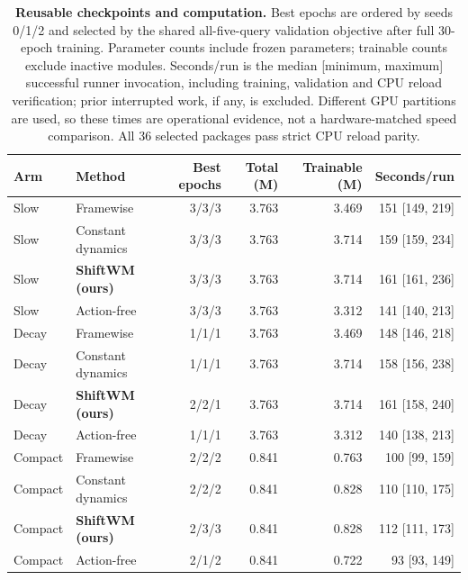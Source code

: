 \begin{table}[p]\centering\footnotesize
\setlength{\tabcolsep}{3.5pt}\renewcommand{\arraystretch}{1.1}
\begin{tabular}{llrrrr}\toprule
Arm & Method & Best epochs & Total (M) & Trainable (M) & Seconds/run\\\midrule
Slow & Framewise & 3/3/3 & 3.763 & 3.469 & 151 [149, 219]\\
Slow & Constant dynamics & 3/3/3 & 3.763 & 3.714 & 159 [159, 234]\\
\rowcolor{orange!9}
Slow & \textbf{ShiftWM (ours)} & 3/3/3 & 3.763 & 3.714 & 161 [161, 236]\\
Slow & Action-free & 3/3/3 & 3.763 & 3.312 & 141 [140, 213]\\
\midrule
Decay & Framewise & 1/1/1 & 3.763 & 3.469 & 148 [146, 218]\\
Decay & Constant dynamics & 1/1/1 & 3.763 & 3.714 & 158 [156, 238]\\
\rowcolor{orange!9}
Decay & \textbf{ShiftWM (ours)} & 2/2/1 & 3.763 & 3.714 & 161 [158, 240]\\
Decay & Action-free & 1/1/1 & 3.763 & 3.312 & 140 [138, 213]\\
\midrule
Compact & Framewise & 2/2/2 & 0.841 & 0.763 & 100 [99, 159]\\
Compact & Constant dynamics & 2/2/2 & 0.841 & 0.828 & 110 [110, 175]\\
\rowcolor{orange!9}
Compact & \textbf{ShiftWM (ours)} & 2/3/3 & 0.841 & 0.828 & 112 [111, 173]\\
Compact & Action-free & 2/1/2 & 0.841 & 0.722 & 93 [93, 149]\\
\bottomrule\end{tabular}
\caption{\textbf{Reusable checkpoints and computation.} Best epochs are ordered by seeds 0/1/2 and selected by the shared all-five-query validation objective after full 30-epoch training. Parameter counts include frozen parameters; trainable counts exclude inactive modules. Seconds/run is the median [minimum, maximum] successful runner invocation, including training, validation and CPU reload verification; prior interrupted work, if any, is excluded. Different GPU partitions are used, so these times are operational evidence, not a hardware-matched speed comparison. All 36 selected packages pass strict CPU reload parity.}
\label{tab:generalization-checkpoints}\end{table}
